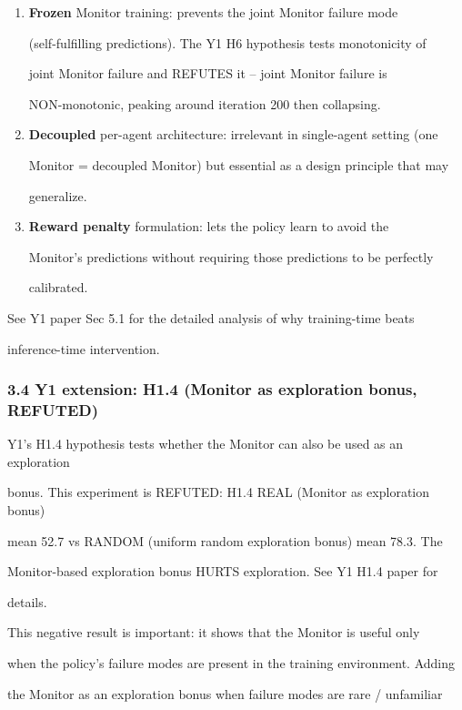 \documentclass[
]{article}
\begin{document}
\begin{enumerate}
\def\labelenumi{\arabic{enumi}.}
\item
  \textbf{Frozen} Monitor training: prevents the joint Monitor failure
  mode

  (self-fulfilling predictions). The Y1 H6 hypothesis tests monotonicity
  of

  joint Monitor failure and REFUTES it -- joint Monitor failure is

  NON-monotonic, peaking around iteration 200 then collapsing.
\item
  \textbf{Decoupled} per-agent architecture: irrelevant in single-agent
  setting (one

  Monitor = decoupled Monitor) but essential as a design principle that
  may

  generalize.
\item
  \textbf{Reward penalty} formulation: lets the policy learn to avoid
  the

  Monitor's predictions without requiring those predictions to be
  perfectly

  calibrated.
\end{enumerate}

See Y1 paper Sec 5.1 for the detailed analysis of why training-time
beats

inference-time intervention.

\subsubsection{3.4 Y1 extension: H1.4 (Monitor as exploration bonus,
REFUTED)}\label{y1-extension-h1.4-monitor-as-exploration-bonus-refuted}

Y1's H1.4 hypothesis tests whether the Monitor can also be used as an
exploration

bonus. This experiment is REFUTED: H1.4 REAL (Monitor as exploration
bonus)

mean 52.7 vs RANDOM (uniform random exploration bonus) mean 78.3. The

Monitor-based exploration bonus HURTS exploration. See Y1 H1.4 paper for

details.

This negative result is important: it shows that the Monitor is useful
only

when the policy's failure modes are present in the training environment.
Adding

the Monitor as an exploration bonus when failure modes are rare /
unfamiliar
\end{document}
